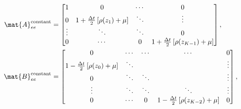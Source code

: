\documentclass{jpmarticle}
\begin{document}
\begin{equation}
  \begin{split}
    \mat{A}_{ee}^{\text{constant}} &=
    \begin{bmatrix}
      1 & 0 & \cdots & 0
      \\
      0 & 1 + \frac{\Delta t}{2} \left[\rho(z_1) + \mu\right] &
      \ddots & \vdots
      \\
      \vdots & \ddots & \ddots & 0
      \\
      0 & \cdots & 0 &
      1 + \frac{\Delta t}{2} \left[\rho(z_{K - 1}) + \mu\right]
    \end{bmatrix},
    \\
    \mat{B}_{ee}^{\text{constant}} &=
    \begin{bmatrix}
      0 & \cdots & \cdots & \cdots & 0
      \\
      1 - \frac{\Delta t}{2} \left[\rho(z_0) + \mu\right] & \ddots &
      & & \vdots
      \\
      0 & \ddots & \ddots & & \vdots
      \\
      \vdots & \ddots & \ddots & \ddots & \vdots
      \\
      0 & \cdots & 0 &
      1 - \frac{\Delta t}{2} \left[\rho(z_{K - 2}) + \mu\right] & 0
    \end{bmatrix},
  \end{split}
\end{equation}
\end{document}
